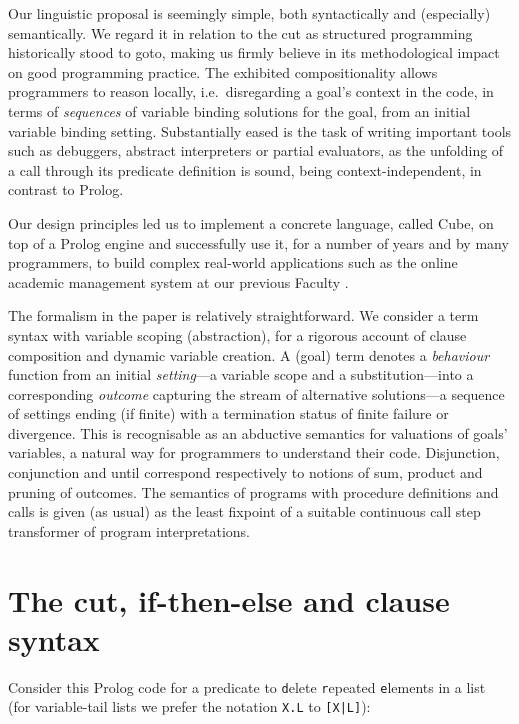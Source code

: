 \documentclass{tlp}
\newcommand{\cube}{\textsf{Cube}}
\begin{document}
Our linguistic proposal is seemingly simple, both syntactically and (especially)
semantically. We regard it in relation to the cut as structured programming
historically stood to \textsf{goto}, making us firmly believe in its
methodological impact on good programming practice.  The exhibited
compositionality allows programmers to reason locally, i.e.\ disregarding a
goal's context in the code, in terms of \emph{sequences} of variable binding
solutions for the goal, from an initial variable binding setting. Substantially
eased is the task of writing important tools such as debuggers, abstract
interpreters or partial evaluators, as the unfolding of a call through its
predicate definition is sound, being context-independent, in contrast to Prolog.

Our design principles led us to implement a concrete language, called \cube, on
top of a Prolog engine and successfully use it, for a number of years and by many
programmers, to build complex real-world applications such as the online academic
management system at our previous Faculty \cite{po:03:iispp}.

The formalism in the paper is relatively straightforward. We consider a term syntax
with variable scoping (abstraction), for a rigorous account of clause composition and
dynamic variable creation. A (goal) term denotes a \emph{behaviour} function
from an initial \emph{setting}---a variable scope and a substitution---into a
corresponding \emph{outcome} capturing the stream of alternative solutions---a
sequence of settings ending (if finite) with a termination status of finite
failure or divergence. This is recognisable as an abductive semantics for
valuations of goals' variables, a natural way for programmers to understand their
code.  Disjunction, conjunction and \textsf{until} correspond respectively to
notions of sum, product and pruning of outcomes. The semantics of programs with
procedure definitions and calls is given (as usual) as the least
fixpoint of a suitable continuous call step transformer of program
interpretations.

\section{The cut, \textsf{if-then-else} and clause syntax}

Consider this Prolog code for a predicate to \verb+d+elete
\verb+r+epeated \verb+e+lements in a list (for
  variable-tail lists we prefer the notation \texttt{X.L} to
  \texttt{[X|L]}):
\end{document}
